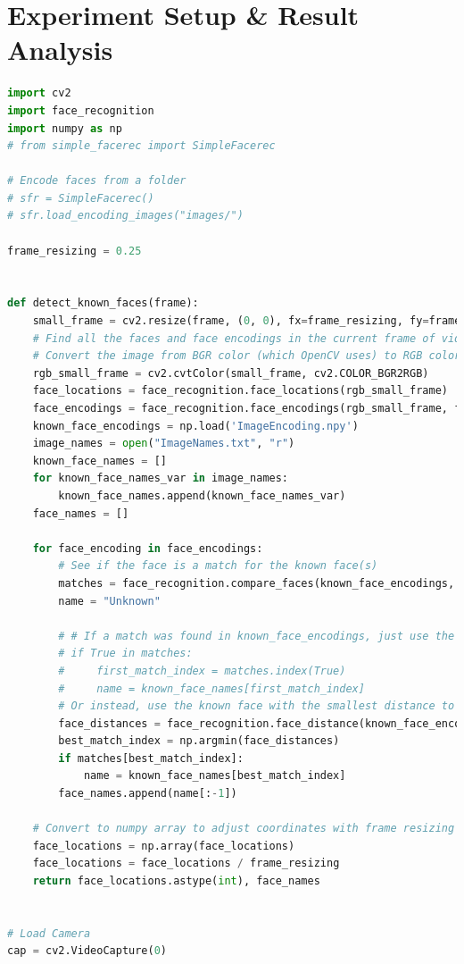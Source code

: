 \documentclass[a4paper]{article}
\begin{document}
\section{Experiment Setup \& Result Analysis}
\begin{lstlisting}[breaklines, language=Python]
import cv2
import face_recognition
import numpy as np
# from simple_facerec import SimpleFacerec

# Encode faces from a folder
# sfr = SimpleFacerec()
# sfr.load_encoding_images("images/")

frame_resizing = 0.25


def detect_known_faces(frame):
    small_frame = cv2.resize(frame, (0, 0), fx=frame_resizing, fy=frame_resizing)
    # Find all the faces and face encodings in the current frame of video
    # Convert the image from BGR color (which OpenCV uses) to RGB color (which face_recognition uses)
    rgb_small_frame = cv2.cvtColor(small_frame, cv2.COLOR_BGR2RGB)
    face_locations = face_recognition.face_locations(rgb_small_frame)
    face_encodings = face_recognition.face_encodings(rgb_small_frame, face_locations)
    known_face_encodings = np.load('ImageEncoding.npy')
    image_names = open("ImageNames.txt", "r")
    known_face_names = []
    for known_face_names_var in image_names:
        known_face_names.append(known_face_names_var)
    face_names = []

    for face_encoding in face_encodings:
        # See if the face is a match for the known face(s)
        matches = face_recognition.compare_faces(known_face_encodings, face_encoding)
        name = "Unknown"

        # # If a match was found in known_face_encodings, just use the first one.
        # if True in matches:
        #     first_match_index = matches.index(True)
        #     name = known_face_names[first_match_index]
        # Or instead, use the known face with the smallest distance to the new face
        face_distances = face_recognition.face_distance(known_face_encodings, face_encoding)
        best_match_index = np.argmin(face_distances)
        if matches[best_match_index]:
            name = known_face_names[best_match_index]
        face_names.append(name[:-1])

    # Convert to numpy array to adjust coordinates with frame resizing quickly
    face_locations = np.array(face_locations)
    face_locations = face_locations / frame_resizing
    return face_locations.astype(int), face_names


# Load Camera
cap = cv2.VideoCapture(0)



\end{lstlisting}
\end{document}
